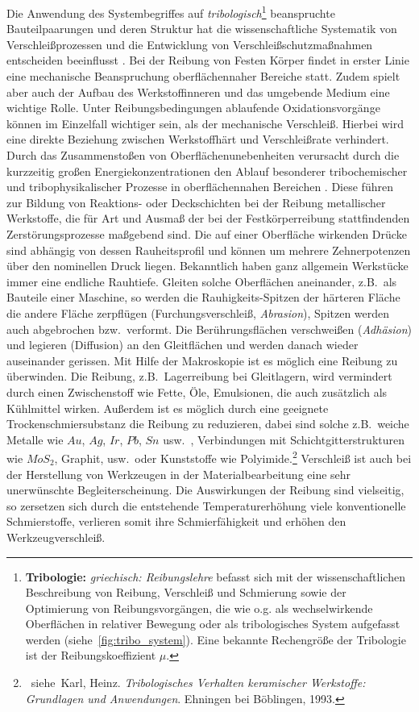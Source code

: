 \documentclass[12pt,a4paper,bibliography=totocnumbered,listof=totocnumbered,fleqn]{scrartcl}
\begin{document}
Die Anwendung des Systembegriffes auf \emph{tribologisch}\footnote{\textbf{Tribologie:} \emph{griechisch: Reibungslehre} befasst sich mit der wissenschaftlichen Beschreibung von Reibung, Verschleiß und Schmierung sowie der Optimierung von Reibungsvorgängen, die wie o.g. als wechselwirkende Oberflächen in relativer Bewegung oder als tribologisches System aufgefasst werden (siehe~\ref{fig:tribo_system}). Eine bekannte Rechengröße der Tribologie ist der Reibungskoeffizient $\mu$.} beanspruchte Bauteilpaarungen und deren Struktur hat die wissenschaftliche Systematik von Verschleißprozessen und die Entwicklung von Verschleißschutzmaßnahmen entscheiden beeinflusst \citep{bach2005moderne}. Bei der Reibung von Festen Körper findet in erster Linie eine mechanische Beanspruchung oberflächennaher Bereiche statt. Zudem spielt aber auch der Aufbau des Werkstoffinneren und das umgebende Medium eine wichtige Rolle. Unter Reibungsbedingungen ablaufende Oxidationsvorgänge können im Einzelfall wichtiger sein, als der mechanische Verschleiß. Hierbei wird eine direkte Beziehung zwischen Werkstoffhärt und Verschleißrate verhindert. Durch das Zusammenstoßen von Oberflächenunebenheiten verursacht durch die kurzzeitig großen Energiekonzentrationen den Ablauf besonderer tribochemischer und tribophysikalischer Prozesse in oberflächennahen Bereichen \citep{bach2005moderne}. Diese führen zur Bildung von Reaktions- oder Deckschichten bei der Reibung metallischer Werkstoffe, die für Art und Ausmaß der bei der Festkörperreibung stattfindenden Zerstörungsprozesse maßgebend sind. Die auf einer Oberfläche wirkenden Drücke sind abhängig von dessen Rauheitsprofil und können um mehrere Zehnerpotenzen über den nominellen Druck liegen. Bekanntlich haben ganz allgemein Werkstücke immer eine endliche Rauhtiefe. Gleiten solche Oberflächen aneinander, z.B.\ als Bauteile einer Maschine, so werden die Rauhigkeits-Spitzen der härteren Fläche die andere Fläche zerpflügen (Furchungsverschleiß, \emph{Abrasion}), Spitzen werden auch abgebrochen bzw.\ verformt. Die Berührungsflächen verschweißen (\emph{Adhäsion}) und legieren (Diffusion) an den Gleitflächen und werden danach wieder auseinander gerissen. Mit Hilfe der Makroskopie ist es möglich eine Reibung zu überwinden. Die Reibung, z.B.\ Lagerreibung bei Gleitlagern, wird vermindert durch einen Zwischenstoff wie Fette, Öle, Emulsionen, die auch zusätzlich als Kühlmittel wirken. Außerdem ist es möglich durch eine geeignete Trockenschmiersubstanz die Reibung zu reduzieren, dabei sind solche z.B.\ weiche Metalle wie $Au$, $Ag$, $Ir$, $Pb$, $Sn$ usw.\ , Verbindungen mit Schichtgitterstrukturen wie $MoS_{2}$, Graphit, usw.\ oder Kunststoffe wie Polyimide.\footnote{~siehe~Karl, Heinz. \textit{Tribologisches Verhalten keramischer Werkstoffe: Grundlagen und Anwendungen}. Ehningen bei Böblingen, 1993.} Verschleiß ist auch bei der Herstellung von Werkzeugen in der Materialbearbeitung eine sehr unerwünschte Begleiterscheinung. Die Auswirkungen der Reibung sind vielseitig, so zersetzen sich durch die entstehende Temperaturerhöhung viele konventionelle Schmierstoffe, verlieren somit ihre Schmierfähigkeit und erhöhen den Werkzeugverschleiß. 
\end{document}
